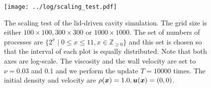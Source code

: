 \begin{figure}[b]
  \centering
  \texttt{[image: ../log/scaling\_test.pdf]}
  \vspace{-3mm}
  \caption{The scaling test of the lid-driven cavity simulation.
  The grid size is either $100 \times 100, 300 \times 300 \text{ or } 1000 \times 1000$.
  The set of numbers of processes are 
  $\{2^x \mid 0 \leq x \leq 11, x \in \mathbb{Z}_{\geq 0}\}$
  and this set is chosen so that the interval of each plot is equally distributed.
  Note that both axes are log-scale.
    The viscosity and the wall velocity are set to $\nu = 0.03$ and $0.1$
    and we perform the update $T = 10000$ times.
    The initial density and velocity are $\rho(\boldsymbol{x}) = 1.0, \boldsymbol{u}(\boldsymbol{x}) = (0, 0)$.
  }
  \label{fig:sliding-lid-scaling}
\end{figure}
